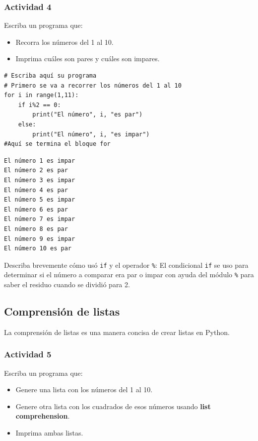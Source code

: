 \documentclass{article}
\begin{document}
\subsubsection{Actividad 4}
\label{sec:org8771df6}
Escriba un programa que:
\begin{itemize}
\item Recorra los números del 1 al 10.
\item Imprima cuáles son pares y cuáles son impares.
\end{itemize}

\begin{verbatim}
# Escriba aquí su programa
# Primero se va a recorrer los números del 1 al 10
for i in range(1,11):
    if i%2 == 0:
        print("El número", i, "es par")
    else:
        print("El número", i, "es impar")
#Aquí se termina el bloque for
\end{verbatim}

\begin{verbatim}
El número 1 es impar
El número 2 es par
El número 3 es impar
El número 4 es par
El número 5 es impar
El número 6 es par
El número 7 es impar
El número 8 es par
El número 9 es impar
El número 10 es par
\end{verbatim}

Describa brevemente cómo usó \texttt{if} y el operador \texttt{\%}:
El condicional \texttt{if} se uso para determinar si el número a comparar era
par o impar con ayuda del módulo \texttt{\%} para saber el residuo cuando se
dividió para 2.

\subsection{Comprensión de listas}
\label{sec:org03d0425}
La comprensión de listas es una manera concisa de crear listas en Python.

\subsubsection{Actividad 5}
\label{sec:org72e4255}
Escriba un programa que:
\begin{itemize}
\item Genere una lista con los números del 1 al 10.
\item Genere otra lista con los cuadrados de esos números usando \textbf{list comprehension}.
\item Imprima ambas listas.
\end{itemize}
\end{document}
